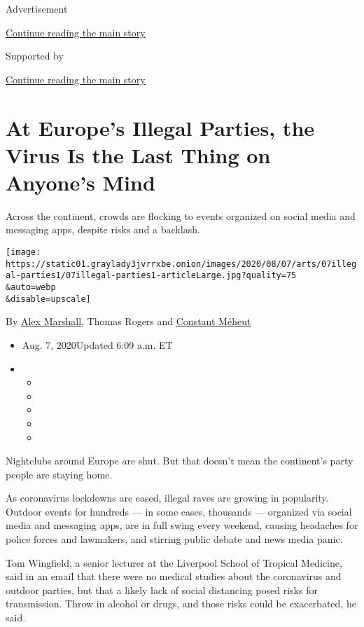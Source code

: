 Advertisement

\protect\hyperlink{after-top}{Continue reading the main story}

Supported by

\protect\hyperlink{after-sponsor}{Continue reading the main story}

\hypertarget{at-europes-illegal-parties-the-virus-is-the-last-thing-on-anyones-mind}{%
\section{At Europe's Illegal Parties, the Virus Is the Last Thing on
Anyone's
Mind}\label{at-europes-illegal-parties-the-virus-is-the-last-thing-on-anyones-mind}}

Across the continent, crowds are flocking to events organized on social
media and messaging apps, despite risks and a backlash.

\texttt{[image: https://static01.graylady3jvrrxbe.onion/images/2020/08/07/arts/07illegal-parties1/07illegal-parties1-articleLarge.jpg?quality=75\\\&auto=webp\\\&disable=upscale]}

By \href{https://www.nytimes3xbfgragh.onion/by/alex-marshall}{Alex
Marshall}, Thomas Rogers and
\href{https://www.nytimes3xbfgragh.onion/by/constant-meheut}{Constant
Méheut}

\begin{itemize}
\item
  Aug. 7, 2020Updated 6:09 a.m. ET
\item
  \begin{itemize}
  \item
  \item
  \item
  \item
  \item
  \end{itemize}
\end{itemize}

Nightclubs around Europe are shut. But that doesn't mean the continent's
party people are staying home.

As coronavirus lockdowns are eased, illegal raves are growing in
popularity. Outdoor events for hundreds --- in some cases, thousands ---
organized via social media and messaging apps, are in full swing every
weekend, causing headaches for police forces and lawmakers, and stirring
public debate and news media panic.

Tom Wingfield, a senior lecturer at the Liverpool School of Tropical
Medicine, said in an email that there were no medical studies about the
coronavirus and outdoor parties, but that a likely lack of social
distancing posed risks for transmission. Throw in alcohol or drugs, and
those risks could be exacerbated, he said.

